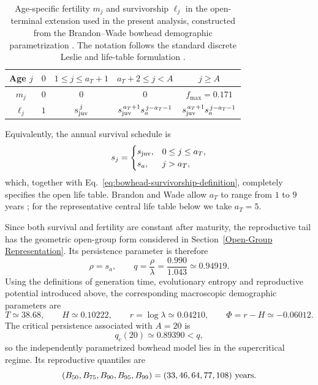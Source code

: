 \documentclass[11pt,a4paper]{amsart}
\begin{document}
\begin{table}[ht]
\centering
\small
\caption{Age-specific fertility $m_j$ and survivorship $\ell_j$ in
the open-terminal extension used in the present analysis, constructed
from the Brandon--Wade bowhead demographic parametrization
\cite{BrandonWade2006}. The notation follows the standard discrete
Leslie and life-table formulation
\cite{ElaydiCushing2024,KeyfitzCaswell2005}.}
\label{tab:bowhead-vital-schedules}
\begin{tabular}{c|c|c|c|c}
\hline
Age $j$
& $0$
& $1\leq j\leq a_T+1$
& $a_T+2\leq j<A$
& $j\geq A$ \\
\hline
$m_j$
& $0$
& $0$
& $0$
& $f_{\max}=0.171$ \\[1mm]
$\ell_j$
& $1$
& $s_{\rm juv}^{\,j}$
& $s_{\rm juv}^{\,a_T+1}s_a^{\,j-a_T-1}$
& $s_{\rm juv}^{\,a_T+1}s_a^{\,j-a_T-1}$ \\
\hline
\end{tabular}
\end{table}

Equivalently, the annual survival schedule is
\begin{equation}
s_j=
\begin{cases}
s_{\rm juv}, & 0\leq j\leq a_T,\\
s_a,         & j>a_T,
\end{cases}
\label{eq:bowhead-survival-schedule}
\end{equation}
which, together with
Eq.~\eqref{eq:bowhead-survivorship-definition}, completely specifies
the open life table. Brandon and Wade allow $a_T$ to range from
$1$ to $9$ years \cite{BrandonWade2006}; for the representative
central life table below we take $a_T=5$.

Since both survival and fertility are constant after maturity, the
reproductive tail has the geometric open-group form considered in
Section~\ref{Open-Group Representation}. Its persistence parameter is
therefore
\begin{equation}
\rho=s_a,\qquad
q=\frac{\rho}{\lambda}
  =\frac{0.990}{1.043}
  \simeq0.94919.
\label{eq:bowhead-q}
\end{equation}
Using the definitions of generation time, evolutionary entropy and
reproductive potential introduced above, the corresponding
macroscopic demographic parameters are
\begin{equation}
T\simeq38.68,\qquad
H\simeq0.10222,\qquad
r=\log\lambda\simeq0.04210,\qquad
\Phi=r-H\simeq-0.06012.
\label{eq:bowhead-macroscopic}
\end{equation}
The critical persistence associated with $A=20$ is
\begin{equation}
q_c(20)\simeq0.89390<q,
\label{eq:bowhead-critical}
\end{equation}
so the independently parametrized bowhead model lies in the
supercritical regime. Its reproductive quantiles are
\begin{equation}
(B_{50},B_{75},B_{90},B_{95},B_{99})
=(33,46,64,77,108)\ {\rm years}.
\label{eq:bowhead-quantiles}
\end{equation}
\end{document}
